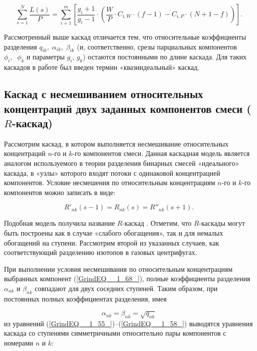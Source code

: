 \begin{equation} \label{GrindEQ__1_62_} 
  \sum _{s=1}^{N}\frac{L(s)}{P} =\sum _{i=1}^{m}\left [\frac{g_{i} +1}{g_{i} -1} \cdot \left(\frac{W}{P} \cdot C_{i,W} \cdot (f-1)-C_{i,P} \cdot \left(N+1-f\right)\right)\right ]   .   
\end{equation} 
  
Рассмотренный выше каскад отличается тем, что относительные коэффициенты разделения $q_{ik} ,\; \alpha _{ik} ,\; \beta _{ik} $ (и, соответственно, срезы парциальных компонентов $\phi _{i} ,\; \; \phi _{k} $ и параметры $g_{i} $, $g_{k} $) остаются постоянными по длине каскада. Для таких каскадов в работе \cite{sazykinKvaziidealnyeKaskadyDlya2000} был введен термин «квазиидеальный» каскад.

\subsection{Каскад с несмешиванием относительных концентраций двух заданных компонентов смеси ($R$-каскад)}\label{R_cas}

Рассмотрим каскад, в котором выполняется несмешивание относительных концентраций $n$-го и $k$-го компонентов смеси. Данная каскадная модель является аналогом используемого в теории разделения бинарных смесей «идеального» каскада, в «узлы» которого входят потоки с одинаковой концентрацией компонентов. Условие несмешения по относительным концентрациям $n$-го и $k$-го компонентов можно записать в виде:

\begin{equation} \label{GrindEQ__1_68_} 
  R'_{nk} (s-1)=R_{nk} (s)=R''_{nk} (s+1).                                                 
\end{equation} 

Подобная модель получила название $R$-каскад \cite{sulaberidzeTeoriyaKaskadovDlya2011}. Отметим, что $R$-каскады могут быть построены как в случае «слабого обогащения», так и для немалых обогащений на ступени. Рассмотрим второй из указанных случаев, как соответствующий разделению изотопов в газовых центрифугах.

При выполнении условия несмешивания по относительным концентрациям выбранных компонент (\ref{GrindEQ__1_68_}), полные коэффициенты разделения $\alpha _{nk}$ и $\beta _{nk}$ совпадают для двух соседних ступеней. Таким образом, при постоянных полных коэффициентах разделения, имея

\begin{equation} \label{GrindEQ__1_69_} 
  \alpha _{nk} =\beta _{nk} =\sqrt{q_{nk} }  
\end{equation} 
из уравнений (\ref{GrindEQ__1_55_})--(\ref{GrindEQ__1_58_}) выводятся уравнения каскада со ступенями симметричными относительно пары компонентов с номерами $n$ и $k$:
  
